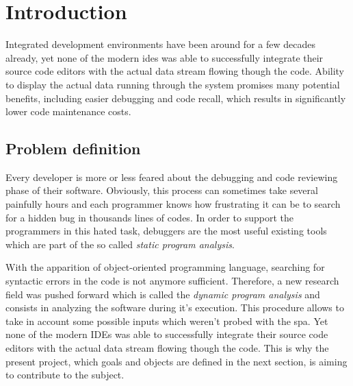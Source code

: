 
\chapter{Introduction} %
\label{chap:introduction}

Integrated development environments have been around for a few decades already, yet none of the modern \glspl{ide} was able to successfully integrate their source code editors with the actual data stream flowing though the code. Ability to display the actual data running through the system promises many potential benefits, including easier debugging and code recall, which results in significantly lower code maintenance costs. 

\section{Problem definition}
Every developer is more or less feared about the debugging and code reviewing phase of their software. Obviously, this process can sometimes take several painfully hours and each programmer knows how frustrating it can be to search for a hidden bug in thousands lines of codes. In order to support the programmers in this hated task, debuggers are the most useful existing tools which are part of the so called \textit{static program analysis}. 

With the apparition of object-oriented programming language, searching for syntactic errors in the code is not anymore sufficient. Therefore, a new research field was pushed forward which is called the \textit{dynamic program analysis} and consists in analyzing the software during it's execution. This procedure allows to take in account some possible inputs which weren't probed with the \gls{spa}. Yet none of the modern IDEs was able to successfully integrate their source code editors with the actual data stream flowing though the code. This is why the present project, which goals and objects are defined in the next section, is aiming to contribute to the subject.

